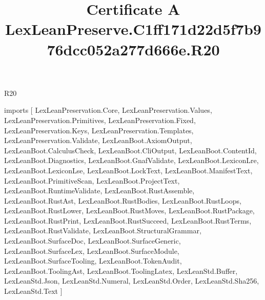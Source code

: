 \begin{lexlean}{R20}
\title{Certificate A LexLeanPreserve.C1ff171d22d5f7b976dcc052a277d666e.R20}
\begin{coremodule}
imports [
  LexLeanPreservation.Core,
  LexLeanPreservation.Values,
  LexLeanPreservation.Primitives,
  LexLeanPreservation.Fixed,
  LexLeanPreservation.Keys,
  LexLeanPreservation.Templates,
  LexLeanPreservation.Validate,
  LexLeanBoot.AxiomOutput,
  LexLeanBoot.CalculusCheck,
  LexLeanBoot.CliOutput,
  LexLeanBoot.ContentId,
  LexLeanBoot.Diagnostics,
  LexLeanBoot.GnafValidate,
  LexLeanBoot.LexiconLre,
  LexLeanBoot.LexiconLse,
  LexLeanBoot.LockText,
  LexLeanBoot.ManifestText,
  LexLeanBoot.PrimitiveScan,
  LexLeanBoot.ProjectText,
  LexLeanBoot.RuntimeValidate,
  LexLeanBoot.RustAssemble,
  LexLeanBoot.RustAst,
  LexLeanBoot.RustBodies,
  LexLeanBoot.RustLoops,
  LexLeanBoot.RustLower,
  LexLeanBoot.RustMoves,
  LexLeanBoot.RustPackage,
  LexLeanBoot.RustPrint,
  LexLeanBoot.RustSucceed,
  LexLeanBoot.RustTerms,
  LexLeanBoot.RustValidate,
  LexLeanBoot.StructuralGrammar,
  LexLeanBoot.SurfaceDoc,
  LexLeanBoot.SurfaceGeneric,
  LexLeanBoot.SurfaceLex,
  LexLeanBoot.SurfaceModule,
  LexLeanBoot.SurfaceTooling,
  LexLeanBoot.TokenAudit,
  LexLeanBoot.ToolingAst,
  LexLeanBoot.ToolingLatex,
  LexLeanStd.Buffer,
  LexLeanStd.Json,
  LexLeanStd.Numeral,
  LexLeanStd.Order,
  LexLeanStd.Sha256,
  LexLeanStd.Text
]


\end{coremodule}
\end{lexlean}
